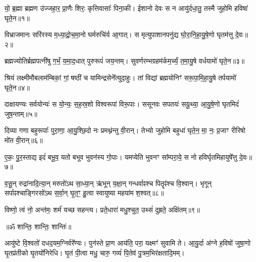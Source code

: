 

यो॒ ब्र॒ह्मा ब्रह्मण उ॑ज्जहा॒र॒ प्रा॒णैः शिरः॒ कृत्तिवासाः᳚ पिना॒की।
ईशानो देवः स न आयु॑र्दधा॒तु॒ तस्मै जुहोमि हविषा॑ घृते॒न॥१॥

विभ्राजमानः सरि॑रस्य म॒ध्या॒द्रो॒च॒मा॒नो घर्मरुचि॑र्य आ॒गात्।
स मृत्युपाशानपनु॑द्य घो॒रा॒नि॒हा॒यु॒षे॒णो घृतम॑त्तु दे॒वः॥२॥

ब्रह्मज्योतिर्ब्रह्मपत्नी॑षु  ग॒र्भं॒ य॒मा॒द॒धात् पुरुरूपं॑ जय॒न्तम्।
सुवर्णरम्भग्रहम॑र्कम॒र्च्यं॒ त॒मा॒यु॒षे वर्धयामो॑ घृते॒न॥३॥

श्रियं लक्ष्मीमौबलाम॑म्बिकां॒ गां॒ षष्ठीं च यामिन्द्रसेने᳚त्युदा॒हुः।
तां विद्यां ब्रह्मयोनिꣳ॑ सरू॒पा॒मि॒हा॒यु॒षे तर्पयामो॑ घृते॒न॥४॥

दाक्षायण्यः सर्वयोन्यः॑ स यो॒न्यः॒ स॒ह॒स्र॒शो विश्वरूपा॑ विरू॒पाः।
ससूनवः सपतयः॑ सयू॒थ्या॒ आ॒यु॒षे॒णो घृतमिदं॑ जुष॒न्ताम्॥५॥

दिव्या गणा बहुरूपाः᳚ पुरा॒णा॒ आ॒यु॒श्छि॒दो नः प्रमथ्न॑न्तु वी॒रान्।
तेभ्यो जुहोमि बहुधा॑ घृते॒न॒ मा॒ नः॒ प्र॒जाꣳ रीरिषो मो॑त वी॒रान्॥६॥

ए॒कः॒ पु॒र॒स्ताद्य इदं॑ बभू॒व॒ यतो बभूव भुवन॑स्य गो॒पाः।
यमप्येति भुवनꣳ सा᳚म्परा॒ये॒ स नो हविर्घृतमिहायुषे᳚त्तु दे॒वः॥७॥

व॒सू॒न् रुद्रा॑नादि॒त्या॒न् मरुतो॑ऽथ सा॒ध्या॒न् ऋ॑भून् य॒क्षा॒न् गन्धर्वाꣴश्च पितॄꣴ॑श्च वि॒श्वान्।
 भृगून् सर्पाꣴश्चाङ्गिरसो॑ऽथ स॒र्वा॒न् घृ॒त॒ꣳ॒ हु॒त्वा स्वायुष्या महया॑म श॒श्वत्॥८॥

विष्णो॒ त्वं नो॒ अन्त॑मः॒ शर्म॑ यच्छ सहन्त्य।
प्रते॒धारा॑ मधु॒श्चुत॒ उथ्सं॑ दुह्रते॒ अक्षि॑तम्॥९॥

\centerline{॥ॐ शान्तिः॒ शान्तिः॒ शान्तिः॑॥}
\vspace{-0.25ex}
\closesection
\vspace{-0.25ex}
आयु॑ष्टे वि॒श्वतो॑ दधद॒यम॒ग्निर्वरे᳚ण्यः। पुन॑स्ते प्रा॒ण आय॑ति॒ परा॒ यक्ष्मꣳ॑ सुवामि ते। आ॒यु॒र्दा अ॑ग्ने ह॒विषो॑ जुषा॒णो घृ॒तप्र॑तीको घृ॒तयो॑निरेधि। घृ॒तं पी॒त्वा मधु॒ चारु॒ गव्यं॑ पि॒तेव॑ पु॒त्रम॒भिर॑क्षतादि॒मम्।